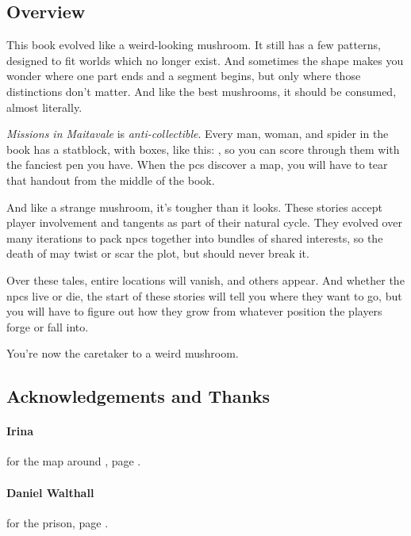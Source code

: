 \begin{multicols}{2}

\subsection*{Overview}

This book evolved like a weird-looking mushroom.
It still has a few patterns, designed to fit worlds which no longer exist.
And sometimes the shape makes you wonder where one part ends and a segment begins, but only where those distinctions don't matter.
And like the best mushrooms, it should be consumed, almost literally.

\randomdozen
\textit{Missions in Maitavale} is \emph{anti-collectible}.
Every man, woman, and spider in the book has a statblock, with  boxes, like this: \setcounter{wounds}{3} , so you can score through them with the fanciest pen you have.
When the \glspl{pc} discover a map, you will have to tear that handout from the middle of the book.
\setcounter{wounds}{0}

And like a strange mushroom, it's tougher than it looks.
These stories accept player involvement and tangents as part of their natural cycle.
They evolved over many iterations to pack \glspl{npc} together into bundles of shared interests, so the death of  may twist or scar the plot, but should never break it.

Over these tales, entire locations will vanish, and others appear.
And whether the \glspl{npc} live or die, the start of these stories will tell you where they want to go, but you will have to figure out how they grow from whatever position the players forge or fall into.

You're now the caretaker to a weird mushroom.

\columnbreak

\subsection*{Acknowledgements and Thanks}

\paragraph{Irina}
for the map around , page \pageref{Irina/greylands}.

\paragraph{Daniel Walthall}
for the prison, page \pageref{Daniel_Walthall/prison}.


\end{multicols}
